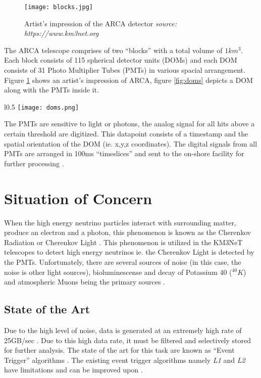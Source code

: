 \begin{figure}[h]
  \centering
  \texttt{[image: blocks.jpg]}
  \caption{Artist's impression of the ARCA detector \textit{source: https://www.km3net.org}}%
  \label{fig:blocks}
\end{figure}

The ARCA telescope comprises of two ``blocks'' with a total volume of
$1km^{3}$. Each block consists of 115 spherical detector units (DOMs)
and each DOM consists of 31 Photo Multiplier Tubes (PMTs) in various
spacial arrangement. Figure \ref{fig:blocks} shows an artist's
impression of ARCA, figure \ref{fig:doms} depicts a DOM along with the
PMTs inside it.

\begin{wrapfigure}{l}{0.5\textwidth}
  \texttt{[image: doms.png]}
  \caption{An optical detector (DOM) \textit{source: https://www.km3net.org}}%
  \label{fig:doms}
\end{wrapfigure}

The PMTs are sensitive to light or photons, the analog signal for all hits
above a certain threshold are digitized. This datapoint consists of a timestamp
and the spatial orientation of the DOM (ie. x,y,z coordinates). The digital
signals from all PMTs are arranged in 100ms ``timeslices'' and sent to the
on-shore facility for further processing \cite{aiello2019km3net}.

\section{Situation of Concern}

When the high energy neutrino particles interact with surrounding matter,
produce an electron and a photon, this phenomenon is known as the Cherenkov
Radiation or Cherenkov Light \cite{margiotta2014km3net}. This phenomenon is
utilized in the KM3NeT telescopes to detect high energy neutrinos ie. the
Cherenkov Light is detected by the PMTs. Unfortunately, there are several
sources of noise (in this case, the noise is other light sources),
bioluminescense and decay of Potassium 40 ($^{40}K$) and atmospheric Muons being
the primary sources \cite{post2019km3nnet}.

\subsection{State of the Art}\label{state-of-the-art}

Due to the high level of noise, data is generated at an extremely high rate of
25GB/sec \cite{adrian2016letter}. Due to this high data rate, it must be
filtered and selectively stored for further analysis. The state of the art for
this task are known as ``Event Trigger'' algorithms
\cite{adrian2016letter,aiello2019km3net}. The existing event trigger algorithms
namely \emph{L1} and \emph{L2} have limitations and can be improved upon
\cite{karas2019data}.

